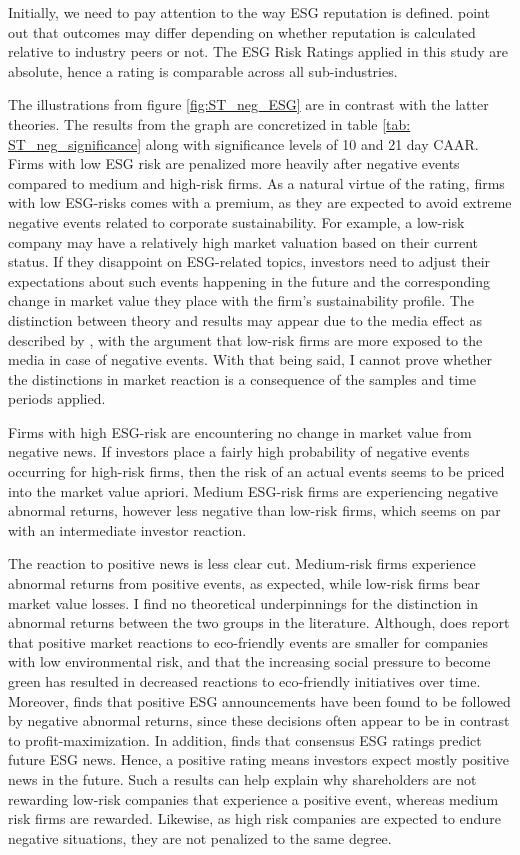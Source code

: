 Initially, we need to pay attention to the way ESG reputation is defined. \cite{rennings2007effect} point out that outcomes may differ depending on whether reputation is calculated relative to industry peers or not. The ESG Risk Ratings applied in this study are absolute, hence a rating is comparable across all sub-industries. 

The illustrations from figure \ref{fig:ST_neg_ESG} are in contrast with the latter theories. The results from the graph are concretized in table \ref{tab: ST_neg_significance} along with significance levels of 10 and 21 day CAAR. Firms with low ESG risk are penalized more heavily after negative events compared to medium and high-risk firms. As a natural virtue of the rating, firms with low ESG-risks comes with a premium, as they are expected to avoid extreme negative events related to corporate sustainability. For example, a low-risk company may have a relatively high market valuation based on their current status. If they disappoint on ESG-related topics, investors need to adjust their expectations about such events happening in the future and the corresponding change in market value they place with the firm's sustainability profile. The distinction between theory and results may appear due to the media effect as described by \cite{noNewsgoodnews}, with the argument that low-risk firms are more exposed to the media in case of negative events. With that being said, I cannot prove whether the distinctions in market reaction is a consequence of the samples and time periods applied. 

Firms with high ESG-risk are encountering no change in market value from negative news. If investors place a fairly high probability of negative events occurring for high-risk firms, then the risk of an actual events seems to be priced into the market value apriori. Medium ESG-risk firms are experiencing negative abnormal returns, however less negative than low-risk firms, which seems on par with an intermediate investor reaction.  

The reaction to positive news is less clear cut. Medium-risk firms experience abnormal returns from positive events, as expected, while low-risk firms bear market value losses. I find no theoretical underpinnings for the distinction in abnormal returns between the two groups in the literature. Although, \cite{flammer2013corporate} does report that positive market reactions to eco-friendly events are smaller for companies with low environmental risk, and that the increasing social pressure to become green has resulted in decreased reactions to eco-friendly initiatives over time. Moreover, \cite{fisher2011voluntary} finds that positive ESG announcements have been found to be followed by negative abnormal returns, since these decisions often appear to be in contrast to profit-maximization.  
In addition,\cite{serafeim2022stock} finds that consensus ESG ratings predict future ESG news. Hence, a positive rating means investors expect mostly positive news in the future. Such a results can help explain why shareholders are not rewarding low-risk companies that experience a positive event, whereas medium risk firms are rewarded. Likewise, as high risk companies are expected to endure negative situations, they are not penalized to the same degree.  


